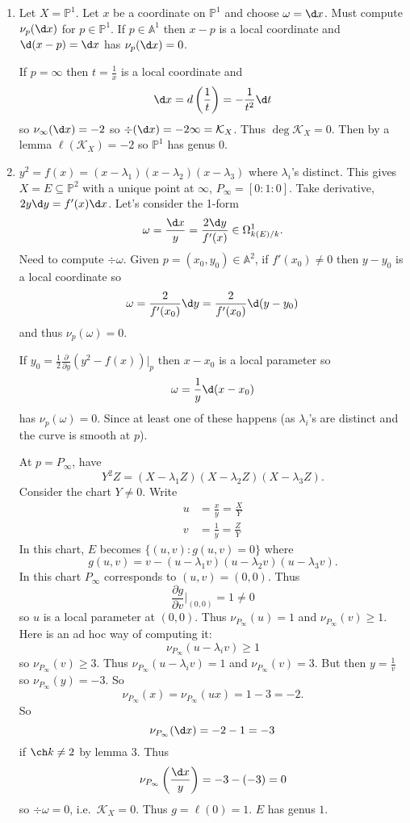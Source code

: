 \documentclass[a4paper]{article}
\renewcommand{\A}{\mathbb{A}}
\renewcommand*{\P}{\mathbb{P}}
\begin{document}
\begin{eg}\leavevmode
  \begin{enumerate}
  \item Let \(X = \P^1\). Let \(x\) be a coordinate on \(\P^1\) and choose \(\omega = \d x\). Must compute \(\nu_p(\d x)\) for \(p \in \P^1\). If \(p \in \A^1\) then \(x - p\) is a local coordinate and \(\d (x - p) = \d x\) has \(\nu_p(\d x) = 0\).

    If \(p = \infty\) then \(t = \frac{1}{x}\) is a local coordinate and
    \[
      \d x = d \left( \frac{1}{t} \right) = -\frac{1}{t^2} \d t
    \]
    so \(\nu_\infty(\d x) = -2\) so \(\div(\d x) = -2 \infty = \mathcal K_X\). Thus \(\deg \mathcal K_X = 0\). Then by a lemma \(\ell(\mathcal K_X) = -2\) so \(\P^1\) has genus \(0\).
  \item \(y^2 = f(x) = (x - \lambda_1)(x - \lambda_2)(x - \lambda_3)\) where \(\lambda_i\)'s distinct. This gives \(X = E \subseteq \P^2\) with a unique point at \(\infty\), \(P_\infty = [0:1:0]\). Take derivative, \(2 y \d y = f'(x) \d x\). Let's consider the 1-form
    \[
      \omega = \frac{\d x}{y} = \frac{2 \d y}{f'(x)} \in \Omega^1_{k(E)/k}.
    \]
    Need to compute \(\div \omega\). Given \(p = (x_0, y_0) \in \A^2\), if \(f'(x_0) \neq 0\) then \(y - y_0\) is a local coordinate so
    \[
      \omega = \frac{2}{f'(x_0)} \d y = \frac{2}{f'(x_0)} \d (y - y_0)
    \]
    and thus \(\nu_p(\omega) = 0\).

    If \(y_0 = \frac{1}{2} \frac{\partial  }{\partial y}(y^2 - f(x))|_p\) then \(x - x_0\) is a local parameter so
    \[
      \omega = \frac{1}{y} \d (x - x_0)
    \]
    has \(\nu_p(\omega) = 0\). Since at least one of these happens (as \(\lambda_i\)'s are distinct and the curve is smooth at \(p\)).

    At \(p = P_\infty\), have
    \[
      Y^2Z = (X - \lambda_1Z)(X - \lambda_2Z)(X - \lambda_3Z).
    \]
    Consider the chart \(Y \neq 0\). Write
    \begin{align*}
      u &= \frac{x}{y} = \frac{X}{Y} \\
      v &= \frac{1}{y} = \frac{Z}{Y}
    \end{align*}
    In this chart, \(E\) becomes \(\{(u, v): g(u, v) = 0\}\) where
    \[
      g(u, v) = v - (u - \lambda_1v)(u - \lambda_2v)(u - \lambda_3v).
    \]
    In this chart \(P_\infty\) corresponds to \((u, v) = (0, 0)\). Thus
    \[
      \frac{\partial g}{\partial v}|_{(0, 0)} = 1 \neq 0
    \]
    so \(u\) is a local parameter at \((0, 0)\). Thus \(\nu_{P_\infty}(u) = 1\) and \(\nu_{P_\infty}(v) \geq 1\). Here is an ad hoc way of computing it:
    \[
      \nu_{P_\infty}(u - \lambda_i v) \geq 1
    \]
    so \(\nu_{P_\infty}(v) \geq 3\). Thus \(\nu_{P_\infty}(u - \lambda_i v) = 1\) and \(\nu_{P_\infty}(v) = 3\). But then \(y = \frac{1}{v}\) so \(\nu_{P_\infty}(y) = -3\). So
    \[
      \nu_{P_\infty}(x) = \nu_{P_\infty}(ux) = 1 - 3 = -2.
    \]
    So
    \[
      \nu_{P_\infty}(\d x) = -2 - 1 = -3
    \]
    if \(\ch k \neq 2\) by lemma 3. Thus
    \[
      \nu_{P_\infty} \left(\frac{\d x}{y}\right) = -3 - (-3) = 0
    \]
    so \(\div \omega = 0\), i.e.\ \(\mathcal K_X = 0\). Thus \(g = \ell(0) = 1\). \(E\) has genus \(1\).
  \end{enumerate}
\end{eg}
\end{document}
